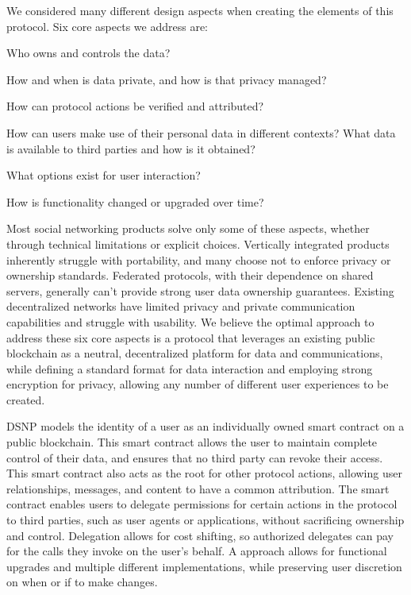 \documentclass[12pt,letterpaper]{article}
\providecommand{\tightlist}{%
\setlength{\itemsep}{0pt}\setlength{\parskip}{0pt}}
\begin{document}
\begin{samepage}
	We considered many different design aspects when creating the elements of
	this protocol. Six core aspects we address are:

	\begin{description}
		\tightlist
		\item[Ownership:]
		      Who owns and controls the data?
		\item[Privacy:]
		      How and when is data private, and how is that privacy managed?
		\item[Authenticity:]
		      How can protocol actions be verified and attributed?
		\item[Portability:]
		      How can users make use of their personal data in different contexts?
		      What data is available to third parties and how is it obtained?
		\item[Usability:]
		      What options exist for user interaction?
		\item[Extensibility:]
		      How is functionality changed or upgraded over time?
	\end{description}
\end{samepage}

Most social networking products solve only some of these aspects, whether through technical
limitations or explicit choices. Vertically integrated products inherently struggle with
portability, and many choose not to enforce privacy or ownership standards. Federated
protocols, with their dependence on shared servers, generally can't provide strong user
data ownership guarantees. Existing decentralized networks have limited privacy and
private communication capabilities and struggle with usability. We believe the optimal
approach to address these six core aspects is a protocol that leverages an existing public
blockchain as a neutral, decentralized platform for data and communications, while
defining a standard format for data interaction and employing strong encryption for
privacy, allowing any number of different user experiences to be created.

DSNP models the identity of a user as an individually owned smart contract on a public
blockchain. This smart contract allows the user to maintain complete control of their
data, and ensures that no third party can revoke their access. This smart contract also
acts as the root for other protocol actions, allowing user relationships, messages, and
content to have a common attribution. The smart contract enables users to delegate
permissions for certain actions in the protocol to third parties, such as user agents or
applications, without sacrificing ownership and control. Delegation allows for cost
shifting, so authorized delegates can pay for the calls they invoke on the user's behalf.
A  approach allows for functional upgrades and multiple different
implementations, while preserving user discretion on when or if to make changes.
\end{document}
